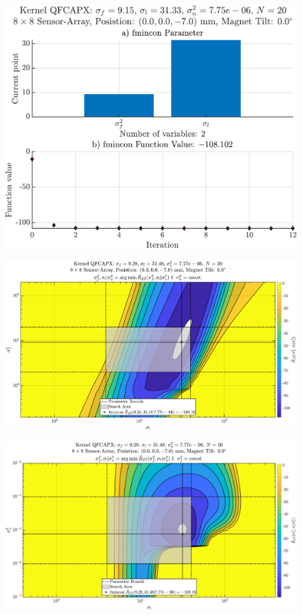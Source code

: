 \documentclass{beamer}
\begin{document}
\begin{frame}
\begin{figure}
\includegraphics[width=.8\linewidth]{images/fmincon_tuning}
\end{figure}
\end{frame}

\begin{frame}
\begin{figure}
\includegraphics[width=\linewidth]{images/Variance_vs_Length}
\end{figure}
\end{frame}

\begin{frame}
\begin{figure}
\includegraphics[width=\linewidth]{images/Noise_vs_Length}
\end{figure}
\end{frame}
\end{document}
